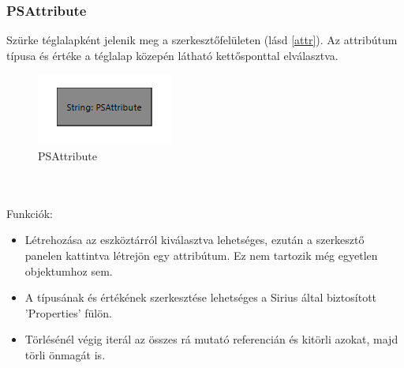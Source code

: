 \subsubsection{PSAttribute}
Szürke téglalapként jelenik meg a szerkesztőfelületen (lásd \autoref{attr}). Az attribútum típusa és értéke a téglalap közepén látható kettősponttal elválasztva.
\begin{figure}[!ht]
	\centering
	\includegraphics{figures/attr.PNG}
	\caption{PSAttribute}
	\label{attr} 
\end{figure}
\\\\
Funkciók:
\begin{itemize}  	
	\item Létrehozása az eszköztárról kiválasztva lehetséges, ezután a szerkesztő panelen kattintva létrejön egy attribútum. Ez nem tartozik még egyetlen objektumhoz sem.
	
	\item A típusának és értékének szerkesztése lehetséges a Sirius által biztosított 'Properties' fülön.
	
	\item Törlésénél végig iterál az összes rá mutató referencián és kitörli azokat, majd törli önmagát is.	

\end{itemize}

